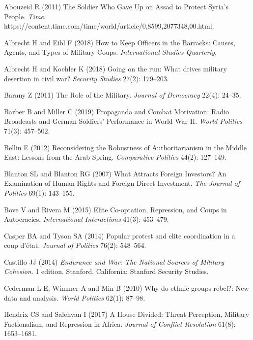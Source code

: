 \documentclass[
  12pt,
]{article}
\newlength{\cslhangindent}
\newenvironment{cslreferences}%
  {\setlength{\parindent}{0pt}%
  \everypar{\setlength{\hangindent}{\cslhangindent}}\ignorespaces}%
  {\par}
\begin{document}
\hypertarget{refs}{}
\begin{cslreferences}
\leavevmode\hypertarget{ref-Abouzeid2011}{}%
Abouzeid R (2011) The Soldier Who Gave Up on Assad to Protect Syria's People. \emph{Time}. https://content.time.com/time/world/article/0,8599,2077348,00.html.

\leavevmode\hypertarget{ref-Albrecht2018a}{}%
Albrecht H and Eibl F (2018) How to Keep Officers in the Barracks: Causes, Agents, and Types of Military Coups. \emph{International Studies Quarterly}.

\leavevmode\hypertarget{ref-Albrecht2018}{}%
Albrecht H and Koehler K (2018) Going on the run: What drives military desertion in civil war? \emph{Security Studies} 27(2): 179--203.

\leavevmode\hypertarget{ref-Barany2011}{}%
Barany Z (2011) The Role of the Military. \emph{Journal of Democracy} 22(4): 24--35.

\leavevmode\hypertarget{ref-Barber2019}{}%
Barber B and Miller C (2019) Propaganda and Combat Motivation: Radio Broadcasts and German Soldiers' Performance in World War II. \emph{World Politics} 71(3): 457--502.

\leavevmode\hypertarget{ref-Bellin2012}{}%
Bellin E (2012) Reconsidering the Robustness of Authoritarianism in the Middle East: Lessons from the Arab Spring. \emph{Comparative Politics} 44(2): 127--149.

\leavevmode\hypertarget{ref-Blanton2007}{}%
Blanton SL and Blanton RG (2007) What Attracts Foreign Investors? An Examination of Human Rights and Foreign Direct Investment. \emph{The Journal of Politics} 69(1): 143--155.

\leavevmode\hypertarget{ref-Bove2015a}{}%
Bove V and Rivera M (2015) Elite Co-optation, Repression, and Coups in Autocracies. \emph{International Interactions} 41(3): 453--479.

\leavevmode\hypertarget{ref-Casper2014}{}%
Casper BA and Tyson SA (2014) Popular protest and elite coordination in a coup d'état. \emph{Journal of Politics} 76(2): 548--564.

\leavevmode\hypertarget{ref-Castillo2014}{}%
Castillo JJ (2014) \emph{Endurance and War: The National Sources of Military Cohesion}. 1 edition. Stanford, California: Stanford Security Studies.

\leavevmode\hypertarget{ref-Cederman2010}{}%
Cederman L-E, Wimmer A and Min B (2010) Why do ethnic groups rebel?: New data and analysis. \emph{World Politics} 62(1): 87--98.

\leavevmode\hypertarget{ref-Hendrix2017}{}%
Hendrix CS and Salehyan I (2017) A House Divided: Threat Perception, Military Factionalism, and Repression in Africa. \emph{Journal of Conflict Resolution} 61(8): 1653--1681.


\end{cslreferences}
\end{document}
